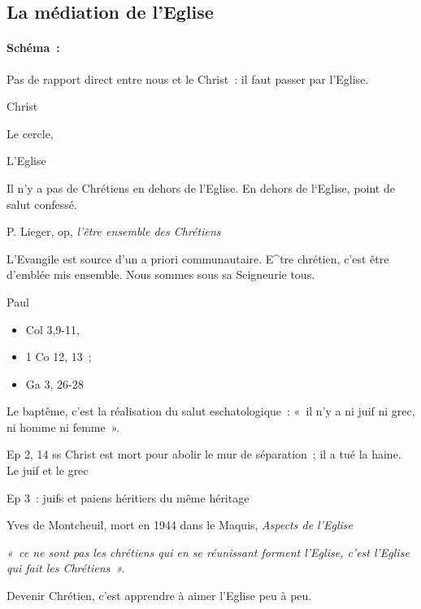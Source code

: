 \hypertarget{la-muxe9diation-de-leglise}{%
\subsection{La médiation de
l'Eglise}\label{la-muxe9diation-de-leglise}}

\hypertarget{schuxe9ma}{%
\paragraph{Schéma~:}\label{schuxe9ma}}

Pas de rapport direct entre nous et le Christ~: il faut passer par
l'Eglise.

Christ

Le cercle,

L'Eglise

Il n'y a pas de Chrétiens en dehors de l'Eglise. En dehors de l`Eglise,
point de salut confessé.

P. Lieger, op, \emph{l'être ensemble des Chrétiens}

L'Evangile est source d'un a priori communautaire. E\^{}tre chrétien,
c'est être d'emblée mis ensemble. Nous sommes sous sa Seigneurie tous.

Paul

\begin{itemize}
\item
   
  Col 3,9-11,
   
\item
   
  1 Co 12, 13~;
   
\item
   
  Ga 3, 26-28
   
\end{itemize}

Le baptême, c'est la réalisation du salut eschatologique~: «~il n'y a ni
juif ni grec, ni homme ni femme~».

Ep 2, 14 ss Christ est mort pour abolir le mur de séparation~; il a tué
la haine. Le juif et le grec

Ep 3~: juifs et paiens héritiers du même héritage

Yves de Montcheuil, mort en 1944 dans le Maquis, \emph{Aspects de
l'Eglise}

\emph{«~ce ne sont pas les chrétiens qui en se réunissant forment
l'Eglise, c'est l'Eglise qui fait les Chrétiens~».}

Devenir Chrétien, c'est apprendre à aimer l'Eglise peu à peu.

